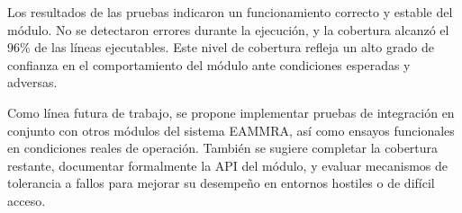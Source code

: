 Los resultados de las pruebas indicaron un funcionamiento correcto y estable del módulo. No se detectaron errores durante la ejecución, y la cobertura alcanzó el 96\% de las líneas ejecutables. Este nivel de cobertura refleja un alto grado de confianza en el comportamiento del módulo ante condiciones esperadas y adversas.

Como línea futura de trabajo, se propone implementar pruebas de integración en conjunto con otros módulos del sistema EAMMRA, así como ensayos funcionales en condiciones reales de operación. También se sugiere completar la cobertura restante, documentar formalmente la API del módulo, y evaluar mecanismos de tolerancia a fallos para mejorar su desempeño en entornos hostiles o de difícil acceso.
%